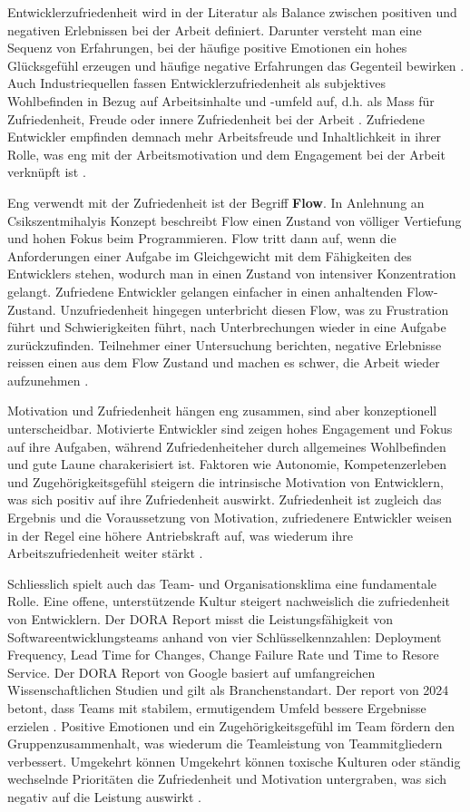 \documentclass[12pt,a4paper]{report}
\begin{document}
Entwicklerzufriedenheit wird in der Literatur als Balance zwischen positiven und negativen Erlebnissen bei der
Arbeit definiert. Darunter versteht man eine Sequenz von Erfahrungen, bei der häufige positive Emotionen ein
hohes Glücksgefühl erzeugen und häufige negative Erfahrungen das Gegenteil bewirken \cite{sadowski_happiness_2019}.
Auch Industriequellen fassen Entwicklerzufriedenheit als subjektives Wohlbefinden in Bezug auf Arbeitsinhalte
und -umfeld auf, d.h. als Mass für Zufriedenheit, Freude oder innere Zufriedenheit bei der Arbeit \cite{zenhub_2022_nodate}.
Zufriedene Entwickler empfinden demnach mehr Arbeitsfreude und Inhaltlichkeit in ihrer Rolle, was eng mit
der Arbeitsmotivation und dem Engagement bei der Arbeit verknüpft ist \cite{franca_motivation_2020}.

Eng verwendt mit der Zufriedenheit ist der Begriff \textbf{Flow}. In Anlehnung an Csikszentmihalyis Konzept beschreibt
Flow einen Zustand von völliger Vertiefung und hohen Fokus beim Programmieren. Flow tritt dann auf, wenn die Anforderungen
einer Aufgabe im Gleichgewicht mit dem Fähigkeiten des Entwicklers stehen, wodurch man in einen Zustand von intensiver 
Konzentration gelangt. Zufriedene Entwickler gelangen einfacher in einen anhaltenden Flow-Zustand. Unzufriedenheit
hingegen unterbricht diesen Flow, was zu Frustration führt und Schwierigkeiten führt, nach Unterbrechungen wieder in
eine Aufgabe zurückzufinden. Teilnehmer einer Untersuchung berichten, negative Erlebnisse reissen einen aus dem Flow
Zustand und machen es schwer, die Arbeit wieder aufzunehmen \cite{sadowski_happiness_2019}.

Motivation und Zufriedenheit hängen eng zusammen, sind aber konzeptionell unterscheidbar. Motivierte Entwickler sind
zeigen hohes Engagement und Fokus auf ihre Aufgaben, während Zufriedenheiteher durch allgemeines Wohlbefinden und gute
Laune charakerisiert ist. Faktoren wie Autonomie, Kompetenzerleben und Zugehörigkeitsgefühl steigern die intrinsische 
Motivation von Entwicklern, was sich positiv auf ihre Zufriedenheit auswirkt. Zufriedenheit ist zugleich das Ergebnis und
die Voraussetzung von Motivation, zufriedenere Entwickler weisen in der Regel eine höhere Antriebskraft auf, was wiederum ihre
Arbeitszufriedenheit weiter stärkt \cite{franca_motivation_2020}.

Schliesslich spielt auch das Team- und Organisationsklima eine fundamentale Rolle. Eine offene, unterstützende Kultur steigert
nachweislich die zufriedenheit von Entwicklern. Der DORA Report misst die Leistungsfähigkeit von Softwareentwicklungsteams anhand
von vier Schlüsselkennzahlen: Deployment Frequency, Lead Time for Changes, Change Failure Rate und Time to Resore Service. Der DORA
Report von Google basiert auf umfangreichen Wissenschaftlichen Studien und gilt als Branchenstandart. Der report von 2024 betont,
dass Teams mit stabilem, ermutigendem Umfeld bessere Ergebnisse erzielen \cite{google_dora_2024}. Positive Emotionen und ein 
Zugehörigkeitsgefühl im Team fördern den Gruppenzusammenhalt, was wiederum die Teamleistung von Teammitgliedern verbessert. 
Umgekehrt können Umgekehrt können toxische Kulturen oder ständig wechselnde Prioritäten die Zufriedenheit und Motivation 
untergraben, was sich negativ auf die Leistung auswirkt \cite{sadowski_happiness_2019}.
\end{document}
